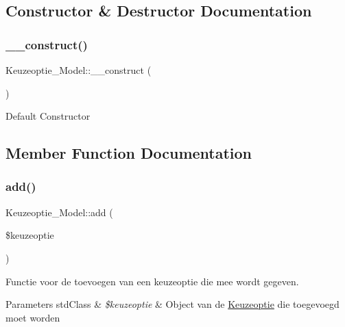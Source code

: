 \subsection{Constructor \& Destructor Documentation}
\mbox{\label{class_keuzeoptie___model_a114b17b36115323960a9837ce075cbcf}} 
\subsubsection{\texorpdfstring{\+\_\+\+\_\+construct()}{\_\_construct()}}
{\footnotesize\ttfamily Keuzeoptie\+\_\+\+Model\+::\+\_\+\+\_\+construct (\begin{DoxyParamCaption}{ }\end{DoxyParamCaption})}

Default Constructor 

\subsection{Member Function Documentation}
\mbox{\label{class_keuzeoptie___model_a05a55a9298a5f2b2a37e3a2ce15046f1}} 
\subsubsection{\texorpdfstring{add()}{add()}}
{\footnotesize\ttfamily Keuzeoptie\+\_\+\+Model\+::add (\begin{DoxyParamCaption}\item[{}]{\$keuzeoptie }\end{DoxyParamCaption})}

Functie voor de toevoegen van een keuzeoptie die mee wordt gegeven. 
\begin{DoxyParams}[1]{Parameters}
std\+Class & {\em \$keuzeoptie} & Object van de \mbox{\hyperlink{class_keuzeoptie}{Keuzeoptie}} die toegevoegd moet worden \\
\hline
\end{DoxyParams}
\mbox{\label{class_keuzeoptie___model_a6ed94c4decb1bb7e43021fb8d45574f7}} 
